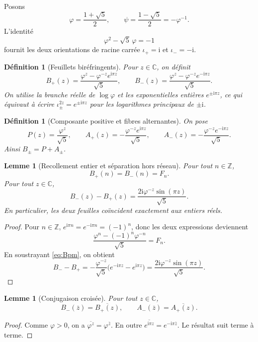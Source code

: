 \documentclass[11pt,a4paper]{article}
\newtheorem{lemma}[theorem]{Lemme}
\newtheorem{definition}[theorem]{Définition}
\newcommand{\C}{\mathbb C}
\newcommand{\Z}{\mathbb Z}
\newcommand{\ii}{\mathrm i}
\newcommand{\ph}{\varphi}
\begin{document}
Posons
\[
 \ph=\frac{1+\sqrt5}{2},\qquad \psi=\frac{1-\sqrt5}{2}=-\ph^{-1}.
\]
L'identité
\[
 \ph^2-\sqrt5\,\ph=-1
\]
fournit les deux orientations de racine carrée $\iota_+=\ii$ et $\iota_-=-\ii$.

\begin{definition}[Feuillets biréfringents]
Pour $z\in\C$, on définit
\begin{equation}\label{eq:Bpm}
 B_+(z)=\frac{\ph^z-\ph^{-z}e^{\ii\pi z}}{\sqrt5},
 \qquad
 B_-(z)=\frac{\ph^z-\ph^{-z}e^{-\ii\pi z}}{\sqrt5}.
\end{equation}
On utilise la branche réelle de $\log\ph$ et les exponentielles entières $e^{\pm\ii\pi z}$, ce qui équivaut à écrire $\iota_\pm^{2z}=e^{\pm\ii\pi z}$ pour les logarithmes principaux de $\pm\ii$.
\end{definition}

\begin{definition}[Composante positive et fibres alternantes]
On pose
\[
 P(z)=\frac{\ph^z}{\sqrt5},\qquad
 A_+(z)=-\frac{\ph^{-z}e^{\ii\pi z}}{\sqrt5},\qquad
 A_-(z)=-\frac{\ph^{-z}e^{-\ii\pi z}}{\sqrt5}.
\]
Ainsi $B_\pm=P+A_\pm$.
\end{definition}

\begin{lemma}[Recollement entier et séparation hors réseau]\label{lem:gluing}
Pour tout $n\in\Z$,
\[
 B_+(n)=B_-(n)=F_n.
\]
Pour tout $z\in\C$,
\begin{equation}\label{eq:sheetdifference}
 B_-(z)-B_+(z)=\frac{2\ii\ph^{-z}\sin(\pi z)}{\sqrt5}.
\end{equation}
En particulier, les deux feuilles coïncident exactement aux entiers réels.
\end{lemma}

\begin{proof}
Pour $n\in\Z$, $e^{\ii\pi n}=e^{-\ii\pi n}=(-1)^n$, donc les deux expressions deviennent
\[
 \frac{\ph^n-(-1)^n\ph^{-n}}{\sqrt5}=F_n.
\]
En soustrayant \eqref{eq:Bpm}, on obtient
\[
 B_--B_+=-\frac{\ph^{-z}}{\sqrt5}
 \bigl(e^{-\ii\pi z}-e^{\ii\pi z}\bigr)
 =\frac{2\ii\ph^{-z}\sin(\pi z)}{\sqrt5}.
\]
\end{proof}

\begin{lemma}[Conjugaison croisée]\label{lem:conj}
Pour tout $z\in\C$,
\[
 B_-(\overline z)=\overline{B_+(z)},\qquad
 A_-(\overline z)=\overline{A_+(z)}.
\]
\end{lemma}

\begin{proof}
Comme $\ph>0$, on a $\overline{\ph^z}=\ph^{\bar z}$. En outre
$\overline{e^{\ii\pi z}}=e^{-\ii\pi\bar z}$. Le résultat suit terme à terme.
\end{proof}
\end{document}
